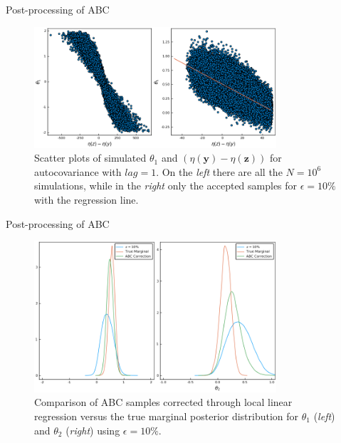 \documentclass[10pt]{beamer}
\begin{document}
\begin{frame}[fragile]{Post-processing of ABC}
  
    \begin{figure}[H]
        \centering
        \includegraphics[width=9cm]{images/RegressionABC1.png}
        \caption{Scatter plots of simulated $\theta_1$ and
        $(\eta(\bm y)-\eta(\bm z))$ for autocovariance with
        $lag = 1$. On the \textit{left} there are all the
        $N=10^6$ simulations, while in the \textit{right} only the
        accepted samples for $\epsilon = 10\%$ with the regression
        line.
        }
    \end{figure}


\end{frame}

\begin{frame}[fragile]{Post-processing of ABC}

    \begin{figure}[H]
        \centering
        \includegraphics[width=9cm]{images/ABCRegression_Marginal.png}
        \caption{Comparison of ABC samples corrected through
        local linear regression versus the true marginal posterior
        distribution for $\theta_1$ (\textit{left}) and
        $\theta_2$ (\textit{right}) using $\epsilon = 10\%$.
        }
    \end{figure}

\end{frame}



\AtBeginSection{}
\end{document}
